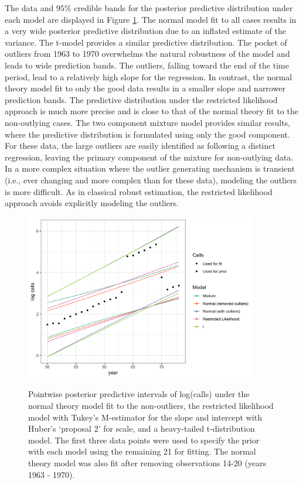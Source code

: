 \documentclass[ba]{imsart}
\begin{document}
The data and  $95\%$ credible bands for the posterior predictive distribution under each model are displayed in Figure \ref{fig:calls_predictive}. The normal model fit to all cases results in a very wide posterior predictive distribution due to an inflated estimate of the variance. The t-model provides a similar predictive distribution.  The pocket of outliers from 1963 to 1970 overwhelms the natural robustness of the model and leads to wide prediction bands.  The outliers, falling toward the end of the time period, lead to a relatively high slope for the regression.  In contrast, the normal theory model fit to only the good data results in a smaller slope and narrower prediction bands.  The predictive distribution under the restricted likelihood approach is much more precise and is close to that of the normal theory fit to the non-outlying cases. The two component mixture model provides similar results, where the predictive distribution is formulated using only the good component. For these data, the large outliers are easily identified as following a distinct regression, leaving the primary component of the mixture for non-outlying data.  In a more complex situation where the outlier generating mechanism is transient (i.e., ever changing and more complex than for these data), modeling the outliers is more difficult. As in classical robust estimation, the restricted likelihood approach avoids explicitly modeling the outliers. 
\begin{figure}[t]
\centering
{\includegraphics[width = 4in]{calls_predictive.png}}
\caption{Pointwise posterior predictive intervals of log(calls) under the normal theory model fit to the non-outliers, the restricted likelihood model with Tukey's M-estimator for the slope and intercept with Huber's `proposal 2'  for scale, and a heavy-tailed t-distribution model. The first three data points were used to specify the prior with each model using the remaining 21 for fitting. The normal theory model was also fit after removing observations 14-20 (years 1963 - 1970).}
\label{fig:calls_predictive}
\end{figure}
\end{document}
